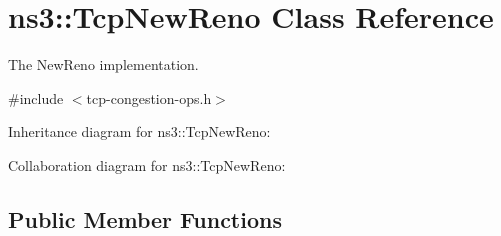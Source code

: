 \hypertarget{classns3_1_1TcpNewReno}{}\section{ns3\+:\+:Tcp\+New\+Reno Class Reference}
\label{classns3_1_1TcpNewReno}


The New\+Reno implementation.  




{\ttfamily \#include $<$tcp-\/congestion-\/ops.\+h$>$}



Inheritance diagram for ns3\+:\+:Tcp\+New\+Reno\+:


Collaboration diagram for ns3\+:\+:Tcp\+New\+Reno\+:
\subsection*{Public Member Functions}
